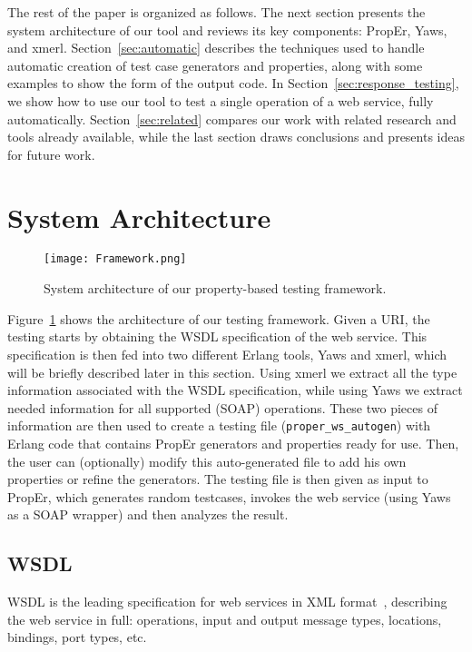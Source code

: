 \documentclass[submission,copyright]{eptcs}
\begin{document}

The rest of the paper is organized as follows.
The next section presents the system architecture of our tool and
reviews its key components: PropEr, Yaws, and xmerl.
Section~\ref{sec:automatic} describes the techniques used to handle
automatic creation of test case generators and properties, along with
some examples to show the form of the output code.
In Section~\ref{sec:response_testing}, we show how to use our tool to
test a single operation of a web service, fully automatically.
Section~\ref{sec:related} compares our work with related research and
tools already available, while the last section draws conclusions and
presents ideas for future work.

\section{System Architecture} \label{sec:architecture}

\begin{figure}[!b]
\centering
\texttt{[image: Framework.png]}
\caption{System architecture of our property-based testing framework.}
\label{fig:architecture}
\end{figure}

Figure~\ref{fig:architecture} shows the architecture of our testing
framework. Given a URI, the testing starts by obtaining the WSDL
specification of the web service. This specification is then fed into
two different Erlang tools, Yaws and xmerl, which will be briefly
described later in this section. Using xmerl we extract all the type
information associated with the WSDL specification, while using Yaws
we extract needed information for all supported (SOAP) operations.
These two pieces of information are then used to create a testing file
(\texttt{proper\_ws\_autogen}) with Erlang code that contains PropEr
generators and properties ready for use. Then, the user can
(optionally) modify this auto-generated file to add his own properties
or refine the generators. The testing file is then given as input to
PropEr, which generates random testcases, invokes the web service
(using Yaws as a SOAP wrapper) and then analyzes the result.

\subsection{WSDL}

WSDL is the leading specification for web services in XML
format~\cite{wsdl_spec}, describing the web service in full:
operations, input and output message types, locations, bindings, port
types, etc.
\end{document}
